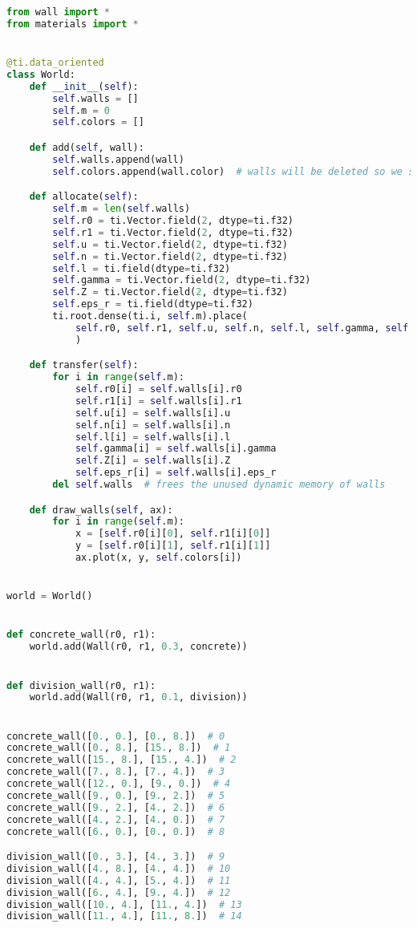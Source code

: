 \begin{lstlisting}[language=python]
from wall import *
from materials import *


@ti.data_oriented
class World:
    def __init__(self):
        self.walls = []
        self.m = 0
        self.colors = []

    def add(self, wall):
        self.walls.append(wall)
        self.colors.append(wall.color)  # walls will be deleted so we store color separately

    def allocate(self):
        self.m = len(self.walls)
        self.r0 = ti.Vector.field(2, dtype=ti.f32)
        self.r1 = ti.Vector.field(2, dtype=ti.f32)
        self.u = ti.Vector.field(2, dtype=ti.f32)
        self.n = ti.Vector.field(2, dtype=ti.f32)
        self.l = ti.field(dtype=ti.f32)
        self.gamma = ti.Vector.field(2, dtype=ti.f32)
        self.Z = ti.Vector.field(2, dtype=ti.f32)
        self.eps_r = ti.field(dtype=ti.f32)
        ti.root.dense(ti.i, self.m).place(
            self.r0, self.r1, self.u, self.n, self.l, self.gamma, self.Z, self.eps_r
            )

    def transfer(self):
        for i in range(self.m):
            self.r0[i] = self.walls[i].r0
            self.r1[i] = self.walls[i].r1
            self.u[i] = self.walls[i].u
            self.n[i] = self.walls[i].n
            self.l[i] = self.walls[i].l
            self.gamma[i] = self.walls[i].gamma
            self.Z[i] = self.walls[i].Z
            self.eps_r[i] = self.walls[i].eps_r
        del self.walls  # frees the unused dynamic memory of walls

    def draw_walls(self, ax):
        for i in range(self.m):
            x = [self.r0[i][0], self.r1[i][0]]
            y = [self.r0[i][1], self.r1[i][1]]
            ax.plot(x, y, self.colors[i])


world = World()


def concrete_wall(r0, r1):
    world.add(Wall(r0, r1, 0.3, concrete))


def division_wall(r0, r1):
    world.add(Wall(r0, r1, 0.1, division))


concrete_wall([0., 0.], [0., 8.])  # 0
concrete_wall([0., 8.], [15., 8.])  # 1
concrete_wall([15., 8.], [15., 4.])  # 2
concrete_wall([7., 8.], [7., 4.])  # 3
concrete_wall([12., 0.], [9., 0.])  # 4
concrete_wall([9., 0.], [9., 2.])  # 5
concrete_wall([9., 2.], [4., 2.])  # 6
concrete_wall([4., 2.], [4., 0.])  # 7
concrete_wall([6., 0.], [0., 0.])  # 8

division_wall([0., 3.], [4., 3.])  # 9
division_wall([4., 8.], [4., 4.])  # 10
division_wall([4., 4.], [5., 4.])  # 11
division_wall([6., 4.], [9., 4.])  # 12
division_wall([10., 4.], [11., 4.])  # 13
division_wall([11., 4.], [11., 8.])  # 14


\end{lstlisting}
